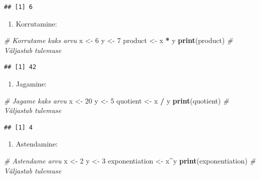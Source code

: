 \documentclass[
]{book}
\newenvironment{Shaded}{\begin{snugshade}}{\end{snugshade}}
\newcommand{\CommentTok}[1]{\textcolor[rgb]{0.56,0.35,0.01}{\textit{#1}}}
\newcommand{\DecValTok}[1]{\textcolor[rgb]{0.00,0.00,0.81}{#1}}
\newcommand{\FunctionTok}[1]{\textcolor[rgb]{0.13,0.29,0.53}{\textbf{#1}}}
\newcommand{\NormalTok}[1]{#1}
\newcommand{\OtherTok}[1]{\textcolor[rgb]{0.56,0.35,0.01}{#1}}
\newcommand{\SpecialCharTok}[1]{\textcolor[rgb]{0.81,0.36,0.00}{\textbf{#1}}}
\providecommand{\tightlist}{%
  \setlength{\itemsep}{0pt}\setlength{\parskip}{0pt}}
\renewenvironment{Shaded} {\begin{snugshade}\footnotesize} {\end{snugshade}}
\begin{document}
\begin{verbatim}
## [1] 6
\end{verbatim}

\begin{enumerate}
\def\labelenumi{\arabic{enumi}.}
\setcounter{enumi}{2}
\tightlist
\item
  Korrutamine:
\end{enumerate}

\begin{Shaded}
\begin{Highlighting}[]
\CommentTok{\# Korrutame kaks arvu}
\NormalTok{x }\OtherTok{\textless{}{-}} \DecValTok{6}
\NormalTok{y }\OtherTok{\textless{}{-}} \DecValTok{7}
\NormalTok{product }\OtherTok{\textless{}{-}}\NormalTok{ x }\SpecialCharTok{*}\NormalTok{ y}
\FunctionTok{print}\NormalTok{(product) }\CommentTok{\# Väljastab tulemuse}
\end{Highlighting}
\end{Shaded}

\begin{verbatim}
## [1] 42
\end{verbatim}

\begin{enumerate}
\def\labelenumi{\arabic{enumi}.}
\setcounter{enumi}{3}
\tightlist
\item
  Jagamine:
\end{enumerate}

\begin{Shaded}
\begin{Highlighting}[]
\CommentTok{\# Jagame kaks arvu}
\NormalTok{x }\OtherTok{\textless{}{-}} \DecValTok{20}
\NormalTok{y }\OtherTok{\textless{}{-}} \DecValTok{5}
\NormalTok{quotient }\OtherTok{\textless{}{-}}\NormalTok{ x }\SpecialCharTok{/}\NormalTok{ y}
\FunctionTok{print}\NormalTok{(quotient) }\CommentTok{\# Väljastab tulemuse}
\end{Highlighting}
\end{Shaded}

\begin{verbatim}
## [1] 4
\end{verbatim}

\begin{enumerate}
\def\labelenumi{\arabic{enumi}.}
\setcounter{enumi}{4}
\tightlist
\item
  Astendamine:
\end{enumerate}

\begin{Shaded}
\begin{Highlighting}[]
\CommentTok{\# Astendame arvu}
\NormalTok{x }\OtherTok{\textless{}{-}} \DecValTok{2}
\NormalTok{y }\OtherTok{\textless{}{-}} \DecValTok{3}
\NormalTok{exponentiation }\OtherTok{\textless{}{-}}\NormalTok{ x}\SpecialCharTok{\^{}}\NormalTok{y}
\FunctionTok{print}\NormalTok{(exponentiation) }\CommentTok{\# Väljastab tulemuse}
\end{Highlighting}
\end{Shaded}
\end{document}
